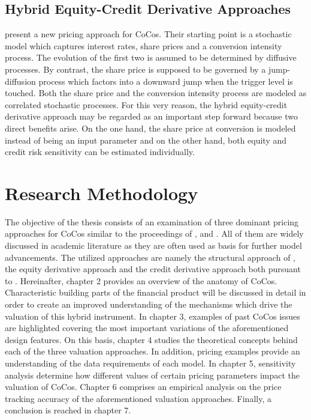 \subsection*{Hybrid Equity-Credit Derivative Approaches}
\citet{turfus2015cocos} present a new pricing approach for CoCos. Their starting point is a stochastic model which captures interest rates, share prices and a conversion intensity process. The evolution of the first two is assumed to be determined by diffusive processes. By contrast, the share price is supposed to be governed by a jump-diffusion process which factors into a downward jump when the trigger level is touched. Both the share price and the conversion intensity process are modeled as correlated stochastic processes. For this very reason, the hybrid equity-credit derivative approach may be regarded as an important step forward because two direct benefits arise. On the one hand, the share price at conversion is modeled instead of being an input parameter and on the other hand, both equity and credit risk sensitivity can be estimated individually.  

\section{Research Methodology}
The objective of the thesis consists of an examination of three dominant pricing approaches for CoCos similar to the proceedings of \citet{alvemar2012modelling}, \citet{erismann2015pricing} and \citet{wilkens2014contingent}. All of them are widely discussed in academic literature as they are often used as basis for further model advancements. The utilized approaches are namely the structural approach of \citet{pennacchi2010structural}, the equity derivative approach and the credit derivative approach both pursuant to \citet{de2011pricing}. Hereinafter, chapter 2 provides an overview of the anatomy of CoCos. Characteristic building parts of the financial product will be discussed in detail in order to create an improved understanding of the mechanisms which drive the valuation of this hybrid instrument. In chapter 3, examples of past CoCos issues are highlighted covering the most important variations of the aforementioned design features. On this basis, chapter 4 studies the theoretical concepts behind each of the three valuation approaches. In addition, pricing examples provide an understanding of the data requirements of each model. In chapter 5, sensitivity analysis determine how different values of certain pricing parameters impact the valuation of CoCos. Chapter 6 comprises an empirical analysis on the price tracking accuracy of the aforementioned valuation approaches. Finally, a conclusion is reached in chapter 7.


